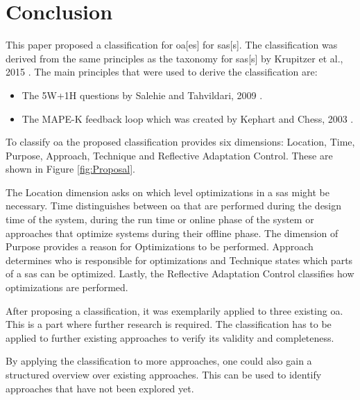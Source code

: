 \section{Conclusion}
\label{ch:Conclusion}


This paper proposed a classification for \acrlong{oa}[es] for \acrlong{sas}[s].
The classification was derived from the same principles as the taxonomy for \acrlong{sas}[s]
by Krupitzer et al., 2015 \cite*{SurveyOnEngineeringApproaches}.
The main principles that were used to derive the classification are:
\begin{itemize}[nosep]
    \item The 5W+1H questions by Salehie and Tahvildari, 2009 \cite*{LandscapeAndResearchChallenges}.
    \item The MAPE-K feedback loop which was created by Kephart and Chess, 2003 \cite*{VisionOfAutonomicComputing}.
\end{itemize}

To classify \acrshort{oa} the proposed classification provides six dimensions:
Location, Time, Purpose, Approach, Technique and Reflective Adaptation Control.
These are shown in Figure \ref{fig:Proposal}.

\noindent The Location dimension asks on which level optimizations in a \acrlong{sas} might be necessary.
Time distinguishes between \acrshort{oa} that are performed during the design time of the system,
during the run time or online phase of the system or approaches that optimize systems during their offline phase.
The dimension of Purpose provides a reason for Optimizations to be performed.
Approach determines who is responsible for optimizations
and Technique states which parts of a \acrshort{sas} can be optimized.
Lastly, the Reflective Adaptation Control classifies how optimizations are performed.

\noindent After proposing a classification, it was exemplarily applied to three existing \acrshort{oa}.
This is a part where further research is required. 
The classification has to be applied to further existing approaches to verify its validity and completeness.

\noindent By applying the classification to more approaches, 
one could also gain a structured overview over existing approaches.
This can be used to identify approaches that have not been explored yet.